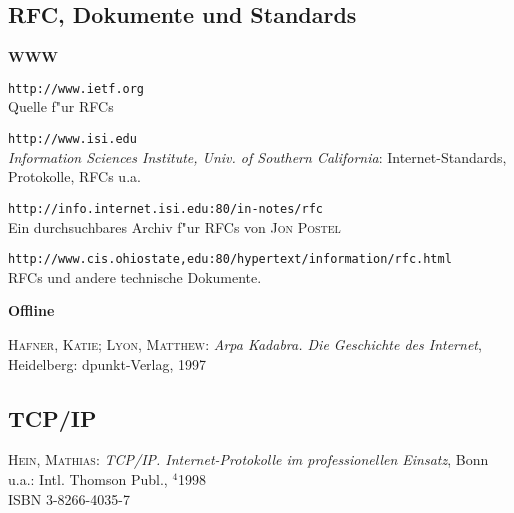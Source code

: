 \subsection{RFC, Dokumente und Standards}

\textbf{WWW}

\begin{description}
  

\item \texttt{http://www.ietf.org} \\
  Quelle f"ur RFCs
  

\item \texttt{http://www.isi.edu} \\
  \textit{Information Sciences Institute, Univ. of Southern
    California}: Internet-Standards, Protokolle, RFCs u.a.
  

\item \texttt{http://info.internet.isi.edu:80/in-notes/rfc} \\
  Ein durchsuchbares Archiv f"ur RFCs von \textsc{Jon Postel}
  

\item \texttt{http://www.cis.ohiostate,edu:80/hypertext/information/rfc.html} \\
  RFCs und andere technische Dokumente.

\end{description}

\noindent \textbf{Offline}

\begin{description}
  
\item \textsc{Hafner, Katie; Lyon, Matthew}: \textit{Arpa Kadabra. Die
    Geschichte des Internet}, Heidelberg: dpunkt-Verlag, 1997

\end{description}


\subsection{TCP/IP}

\begin{description}
  
\item \textsc{Hein, Mathias}: \textit{TCP/IP.  Internet-Protokolle im
    professionellen Einsatz},
  Bonn u.a.: Intl. Thomson Publ., $^4$1998 \\
  ISBN 3-8266-4035-7

\end{description}

